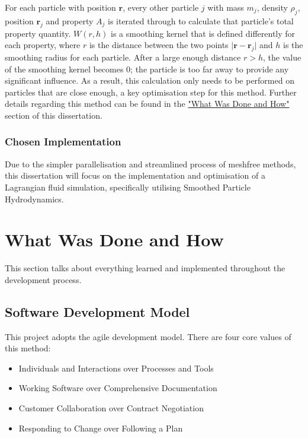\documentclass[12pt]{article}
\begin{document}
    For each particle with position $\textbf{r}$, every other particle $j$ with mass $m_j$, density $\rho_j$, position $\textbf{r}_j$ and property $A_j$ is iterated through to calculate that particle's total property quantity. $W(r, h)$ is a smoothing kernel that is defined differently for each property, where $r$ is the distance between the two points $\lvert\textbf{r} - \textbf{r}_j\rvert$ and $h$ is the smoothing radius for each particle. After a large enough distance $r > h$, the value of the smoothing kernel becomes 0; the particle is too far away to provide any significant influence. As a result, this calculation only needs to be performed on particles that are close enough, a key optimisation step for this method. Further details regarding this method can be found in the \hyperref[sec:whatwasdoneandhow]{"What Was Done and How"} section of this dissertation.

    \subsubsection{Chosen Implementation}

    Due to the simpler parallelisation and streamlined process of meshfree methods, this dissertation will focus on the implementation and optimisation of a Lagrangian fluid simulation, specifically utilising Smoothed Particle Hydrodynamics.

    \newpage

    \section{What Was Done and How}
    \label{sec:whatwasdoneandhow}

    This section talks about everything learned and implemented throughout the development process.

    \subsection{Software Development Model}

    This project adopts the agile development model. There are four core values of this method\cite{geekagile}:
    
    \begin{itemize}
        \item Individuals and Interactions over Processes and Tools
        \item Working Software over Comprehensive Documentation
        \item Customer Collaboration over Contract Negotiation
        \item Responding to Change over Following a Plan
    \end{itemize}
\end{document}
